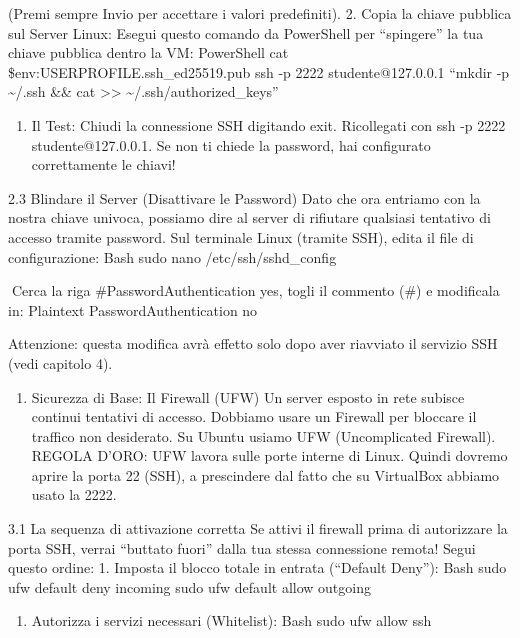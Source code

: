 \documentclass[11pt,a4paper]{article}
\providecommand{\tightlist}{%
  \setlength{\itemsep}{0pt}\setlength{\parskip}{0pt}}
\begin{document}
(Premi sempre Invio per accettare i valori predefiniti). 2. Copia la
chiave pubblica sul Server Linux: Esegui questo comando da PowerShell
per ``spingere'' la tua chiave pubblica dentro la VM: PowerShell cat
\$env:USERPROFILE.ssh\id\_ed25519.pub \textbar{} ssh -p 2222
studente@127.0.0.1 ``mkdir -p \textasciitilde/.ssh \&\& cat
\textgreater\textgreater{} \textasciitilde/.ssh/authorized\_keys''

\begin{enumerate}
\def\labelenumi{\arabic{enumi}.}
\setcounter{enumi}{2}
\tightlist
\item
  Il Test: Chiudi la connessione SSH digitando exit. Ricollegati con ssh
  -p 2222 studente@127.0.0.1. Se non ti chiede la password, hai
  configurato correttamente le chiavi!
\end{enumerate}

2.3 Blindare il Server (Disattivare le Password) Dato che ora entriamo
con la nostra chiave univoca, possiamo dire al server di rifiutare
qualsiasi tentativo di accesso tramite password. Sul terminale Linux
(tramite SSH), edita il file di configurazione: Bash sudo nano
/etc/ssh/sshd\_config

Cerca la riga \#PasswordAuthentication yes, togli il commento (\#) e
modificala in: Plaintext PasswordAuthentication no

Attenzione: questa modifica avrà effetto solo dopo aver riavviato il
servizio SSH (vedi capitolo 4).

\begin{enumerate}
\def\labelenumi{\arabic{enumi}.}
\setcounter{enumi}{2}
\tightlist
\item
  Sicurezza di Base: Il Firewall (UFW) Un server esposto in rete subisce
  continui tentativi di accesso. Dobbiamo usare un Firewall per bloccare
  il traffico non desiderato. Su Ubuntu usiamo UFW (Uncomplicated
  Firewall). REGOLA D'ORO: UFW lavora sulle porte interne di Linux.
  Quindi dovremo aprire la porta 22 (SSH), a prescindere dal fatto che
  su VirtualBox abbiamo usato la 2222.
\end{enumerate}

3.1 La sequenza di attivazione corretta Se attivi il firewall prima di
autorizzare la porta SSH, verrai ``buttato fuori'' dalla tua stessa
connessione remota! Segui questo ordine: 1. Imposta il blocco totale in
entrata (``Default Deny''): Bash sudo ufw default deny incoming sudo ufw
default allow outgoing

\begin{enumerate}
\def\labelenumi{\arabic{enumi}.}
\setcounter{enumi}{1}
\tightlist
\item
  Autorizza i servizi necessari (Whitelist): Bash sudo ufw allow ssh
\end{enumerate}
\end{document}
